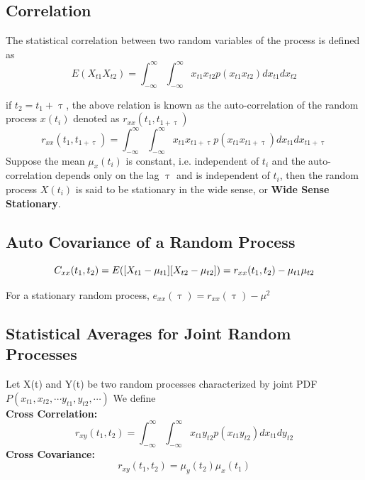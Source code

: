 \subsection{Correlation}
The statistical correlation between two random variables of the process is defined as $$ E(X_{t1}X_{t2}) = \int_{-\infty}^{\infty} \int_{-\infty}^{\infty} x_{t1}x_{t2} p(x_{t1}x_{t2})dx_{t1}dx_{t2}$$

if $t_2 = t_1 + \uptau$, the above relation is known as the auto-correlation of the random process $x(t_i)$ denoted as $r_{xx}(t_1,t_{1+\uptau})$
$$r_{xx}(t_1,t_{1+\uptau}) = \int_{-\infty}^{\infty} \int_{-\infty}^{\infty} x_{t1}x_{t1 + \uptau} p(x_{t1}x_{t1 + \uptau})dx_{t1}dx_{t1 + \uptau}$$
Suppose the mean $\mu_x(t_i)$ is constant, i.e. independent of $t_i$ and the auto-correlation depends only on the lag $\uptau$ and is independent of $t_i$, then the random process $X(t_i)$ is said to be stationary in the wide sense, or \textbf {Wide Sense Stationary}.

\subsection{Auto Covariance of a Random Process}

$$ C_{xx}(t_1,t_2) = E([X_{t1}-\mu_{t1}][X_{t2}-\mu_{t2}])\\ =r_{xx}(t_1,t_2) - \mu_{t1}\mu_{t2} $$    

For a stationary random process, $e_{xx}(\uptau) = r_{xx}(\uptau) - \mu^2 $

\subsection{Statistical Averages for Joint Random Processes}
Let X(t) and Y(t) be two random processes characterized by joint PDF $P(x_{t1}, x_{t2}, \cdots y_{t1},y_{t2}, \cdots ) $ We define \\ \textbf{Cross Correlation: } $$ r_{xy}(t_1,t_2) = \int_{-\infty}^{\infty} \int_{-\infty}^{\infty} x_{t1}y_{t2} p(x_{t1}y_{t2})dx_{t1}dy_{t2}$$
\textbf{Cross Covariance: } $$ r_{xy}(t_1,t_2) = \mu_y(t_2)\mu_x(t_1)$$


